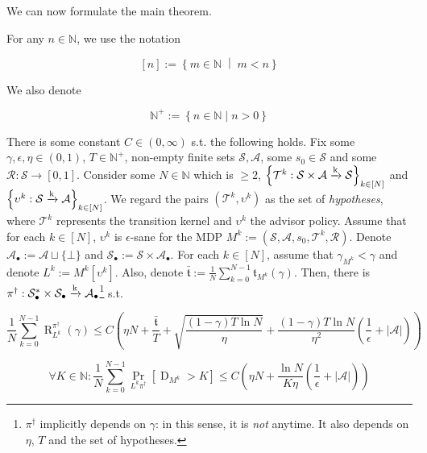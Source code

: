 \documentclass[anon,12pt]{colt2018} %
\newcommand{\AP}[1]{\left(#1\right)}
\newcommand{\AB}[1]{\left[#1\right]}
\newcommand{\AC}[1]{\left\{#1\right\}}
\newcommand{\ACM}[2]{\left\{#1\;\middle\vert\;#2\right\}}
\newcommand{\Pa}[2]{\underset{#1}{\operatorname{Pr}}\AB{#2}}
\newcommand{\Nats}{\mathbb{N}}
\newcommand{\Abs}[1]{\left\vert #1 \right\vert}
\newcommand{\K}{\xrightarrow{\textnormal{k}}}
\newcommand{\A}{\mathcal{A}}
\newcommand{\St}{\mathcal{S}}
\newcommand{\T}{\mathcal{T}}
\newcommand{\R}{\mathcal{R}}
\newcommand{\Rg}{\operatorname{R}}
\newcommand{\MP}[2]{#1#2}
\newcommand{\MA}[2]{#1\AB{#2}}
\newcommand{\Tn}{\mathfrak{t}}
\newcommand{\Ad}{\upsilon}
\newcommand{\ND}{\operatorname{D}}
\newcommand{\X}{\bullet}
\begin{document}
We can now formulate the main theorem.

For any $n \in \Nats$, we use the notation 

\[[n]:=\ACM{m\in\Nats}{m < n}\] 

We also denote 

\[\Nats^+:=\AC{n \in \Nats \mid n > 0}\]

\begin{samepage}
\begin{theorem}
\label{thm:regret_bound}

There is some constant $C \in (0,\infty)$ s.t. the following holds. Fix some $\gamma,\epsilon,\eta \in (0,1)$, $T\in\Nats^+$, non-empty finite sets $\St,\A$, some $s_0 \in \St$ and some $\R: \St \rightarrow [0,1]$. Consider some $N \in \Nats$ which is $\geq 2$, $\AC{\T^k: \St \times \A \K \St}_{k\in[N]}$ and $\AC{\Ad^k :\St \K \A}_{k\in[N]}$. We regard the pairs $(\T^k,\Ad^k)$ as the set of \emph{hypotheses}, where $\T^k$ represents the transition kernel and $\Ad^k$ the advisor policy. Assume that for each $k\in[N]$, $\Ad^k$ is $\epsilon$-sane for the MDP $M^k:=\AP{\St,\A,s_0,\T^k,\R}$. Denote $\A_\X:=\A\sqcup\{\bot\}$ and $\St_\X:=\St \times \A_\X$. For each $k \in [N]$, assume that $\gamma_{M^k} < \gamma$ and denote $L^k:=\MA{M^k}{\Ad^k}$. Also, denote $\bar{\Tn}:=\frac{1}{N}\sum_{k=0}^{N-1} \Tn_{M^k}(\gamma)$. Then, there is $\pi^\dagger: \St_\X^* \times \St_\X \K \A_\X$\footnote{$\pi^\dagger$ implicitly depends on $\gamma$: in this sense, it is \emph{not} anytime. It also depends on $\eta$, $T$ and the set of hypotheses.} s.t.

\begin{equation}
\label{eqn:thm__regret_bound__regret}
\frac{1}{N}\sum_{k=0}^{N-1}\Rg_{L^k}^{\pi^\dagger}(\gamma) \leq C\AP{\eta N+\frac{\bar{\Tn}}{T}+\sqrt{\frac{(1-\gamma) T \ln{N}}{\eta}}+\frac{(1-\gamma)T \ln{N}}{\eta^2}\AP{\frac{1}{\epsilon}+\Abs{\A}}}
\end{equation}


\begin{equation}
\label{eqn:thm__regret_bound__delegations}
\forall K \in \Nats: \frac{1}{N}\sum_{k=0}^{N-1}\Pa{\MP{L^k}{\pi^\dagger}}{\ND_{M^k} > K} \leq C\AP{\eta N +\frac{\ln{N}}{K\eta}\AP{\frac{1}{\epsilon}+\Abs{\A}}}
\end{equation}

\end{theorem}
\end{samepage}
\end{document}
